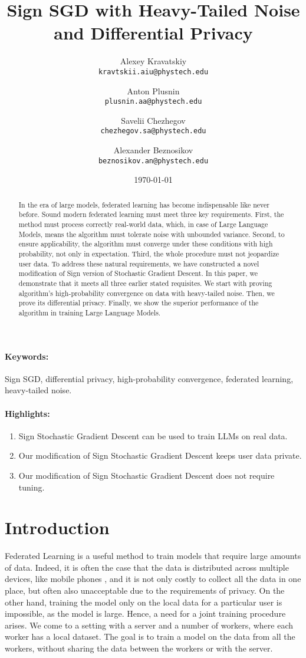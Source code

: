 \documentclass{article}
\title{Sign SGD with Heavy-Tailed Noise and Differential Privacy}
\author{
  Alexey Kravatskiy\\
  \texttt{kravtskii.aiu@phystech.edu}
  \and
  Anton Plusnin\\
  \texttt{plusnin.aa@phystech.edu}
  \and
  Savelii Chezhegov\\
  \texttt{chezhegov.sa@phystech.edu}
  \and
  Alexander Beznosikov\\
  \texttt{beznosikov.an@phystech.edu}
}
\date{\today}
\begin{document}
\maketitle

\begin{abstract}
In the era of large models, federated learning has become indispensable like never before. Sound modern federated learning must meet three key requirements. First, the method must process correctly real-world data, which, in case of Large Language Models, means the algorithm must tolerate noise with unbounded variance. Second, to ensure applicability, the algorithm must converge under these conditions with high probability, not only in expectation. Third, the whole procedure must not jeopardize user data. To address these natural requirements, we have constructed a novel modification of Sign version of Stochastic Gradient Descent. In this paper, we demonstrate that it meets all three earlier stated requisites. We start with proving algorithm's high-probability convergence on data with heavy-tailed noise. Then, we prove its differential privacy. Finally, we show the superior performance of the algorithm in training Large Language Models.

\end{abstract}

\paragraph{Keywords:} Sign SGD, differential privacy, high-probability convergence, federated learning, heavy-tailed noise.

\paragraph{Highlights:}
\begin{enumerate}
\item Sign Stochastic Gradient Descent can be used to train LLMs on real data.
\item Our modification of Sign Stochastic Gradient Descent keeps user data private.
\item Our modification of Sign Stochastic Gradient Descent does not require tuning.
\end{enumerate}

\section{Introduction}
Federated Learning is a useful method to train models that require large amounts of data. Indeed, it is often the case that the data is distributed across multiple devices, like mobile phones \parencite{McMahan2017}, and it is not only costly to collect all the data in one place, but often also unacceptable due to the requirements of privacy. On the other hand, training the model only on the local data for a particular user is impossible, as the model is large. Hence, a need for a joint training procedure arises. We come to a setting with a server and a number of workers, where each worker has a local dataset. The goal is to train a model on the data from all the workers, without sharing the data between the workers or with the server.
\end{document}

